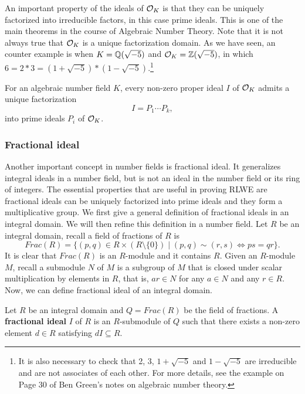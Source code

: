 \documentclass[../main.tex]{subfiles}
\begin{document}
An important property of the ideals of $\mathcal{O}_K$ is that they can be uniquely factorized into irreducible factors, in this case prime ideals. This is one of the main theorems in the course of Algebraic Number Theory. Note that it is not always true that $\mathcal{O}_K$ is a unique factorization domain. As we have seen, an counter example is when $K=\mathbb{Q}(\sqrt{-5})$ and $\mathcal{O}_K=\mathbb{Z}(\sqrt{-5})$, in which $6 = 2 * 3=(1+\sqrt{-5})*(1-\sqrt{-5})$.\footnote{It is also necessary to check that 2, 3, $1+\sqrt{-5}$ and $1-\sqrt{-5}$ are irreducible and are not associates of each other. For more details, see the example on Page 30 of Ben Green's notes on algebraic number theory.}

\begin{theorem}
\label{app thm:idealsOKUFD}
\reversemarginpar
{}
For an algebraic number field $K$, every non-zero proper ideal $I$ of $\mathcal{O}_K$ admits a unique factorization
\begin{equation*}
    I = P_1 \cdots P_k,
\end{equation*}
into prime ideals $P_i$ of $\mathcal{O}_K$. 
\end{theorem}


\subsubsection{Fractional ideal}

Another important concept in number fields is fractional ideal. It generalizes integral ideals in a number field, but is not an ideal in the number field or its ring of integers. The essential properties that are useful in proving RLWE are fractional ideals can be uniquely factorized into prime ideals and they form a multiplicative group. We first give a general definition of fractional ideals in an integral domain. We will then refine this definition in a number field. Let $R$ be an integral domain, recall a field of fractions of $R$ is 
\begin{equation*}
    Frac(R)=\{(p,q) \in R \times (R\setminus \{0\}) \mid (p,q) \sim (r,s) \iff ps=qr\}.
\end{equation*}
It is clear that $Frac(R)$ is an $R$-module and it contains $R$. Given an $R$-module $M$, recall a submodule $N$ of $M$ is a subgroup of $M$ that is closed under scalar multiplication by elements in $R$, that is, $ar \in N$ for any $a \in N$ and any $r \in R$. Now, we can define fractional ideal of an integral domain. 


\begin{definition}
\label{app def:fracIdeal}
Let $R$ be an integral domain and $Q=Frac(R)$ be the field of fractions. A
\reversemarginpar
{}
\textbf{fractional ideal} $I$ of $R$ is an $R$-submodule of $Q$ such that there exists a non-zero element $d \in R$ satisfying $dI \subseteq R$. 
\end{definition}
\end{document}
